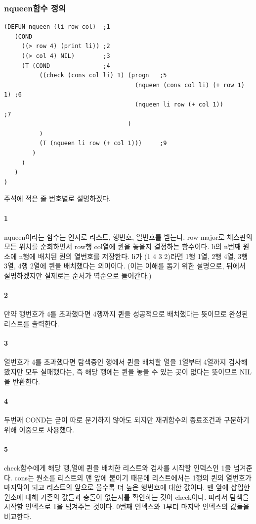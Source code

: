 \documentclass{oblivoir}
\begin{document}
\subsubsection{nqueen함수 정의}

\begin{verbatim}
(DEFUN nqueen (li row col)  ;1
   (COND 
     ((> row 4) (print li)) ;2
     ((> col 4) NIL)        ;3
     (T (COND               ;4
          ((check (cons col li) 1) (progn   ;5
                                     (nqueen (cons col li) (+ row 1) 1) ;6
                                     (nqueen li row (+ col 1))          ;7
                                   )
          )
          (T (nqueen li row (+ col 1)))     ;9
        )
     )
   )
)
\end{verbatim}
주석에 적은 줄 번호별로 설명하겠다.

\paragraph*{1}nqueen이라는 함수는 인자로 리스트, 행번호, 열번호를 받는다.
row-major로 체스판의 모든 위치를 순회하면서 row행 col열에 퀸을 놓을지 결정하는 함수이다.
li의 n번째 원소에 n행에 배치된 퀸의 열번호를 저장한다. li가 (1 4 3 2)라면 1행 1열, 2행 4열, 3행 3열, 4행 2열에 퀸을 배치했다는 의미이다. (이는 이해를 돕기 위한 설명으로, 뒤에서 설명하겠지만 실제로는 순서가 역순으로 들어간다.)

\paragraph*{2}만약 행번호가 4를 초과했다면 4행까지 퀸을 성공적으로 배치했다는 뜻이므로 완성된 리스트를 출력한다.

\paragraph*{3}열번호가 4를 초과했다면 탐색중인 행에서 퀸을 배치할 열을 1열부터 4열까지 검사해봤지만 모두 실패했다는, 즉 해당 행에는 퀸을 놓을 수 있는 곳이 없다는 뜻이므로 NIL을 반환한다.

\paragraph*{4}두번째 COND는 굳이 따로 분기하지 않아도 되지만 재귀함수의 종료조건과 구분하기 위해 이중으로 사용했다.

\paragraph*{5}check함수에게 해당 행,열에 퀸을 배치한 리스트와 검사를 시작할 인덱스인 1을 넘겨준다. cons는 원소를 리스트의 맨 앞에 붙이기 때문에 리스트에서는 1행의 퀸의 열번호가 마지막이 되고 리스트의 앞으로 올수록 더 높은 행번호에 대한 값이다. 
맨 앞에 삽입한 원소에 대해 기존의 값들과 충돌이 없는지를 확인하는 것이 check이다. 따라서 탐색을 시작할 인덱스로 1을 넘겨주는 것이다. 0번째 인덱스와 1부터 마지막 인덱스의 값들을 비교한다.
\end{document}
